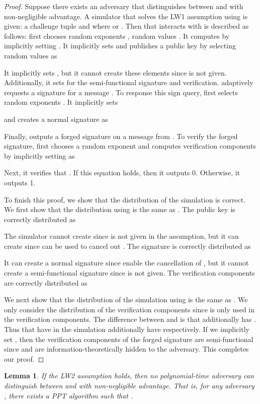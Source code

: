 \documentclass[11pt,letterpaper]{article}
\newcommand{\vs}{\vspace{1.5mm}}
\newtheorem{lemma}[theorem]{Lemma}
\begin{document}
\begin{proof}
Suppose there exists an adversary  that distinguishes between
 and  with non-negligible advantage. A simulator
 that solves the LW1 assumption using  is given: a
challenge tuple
     and 
    where  or .
Then  that interacts with  is described as follows:
 first chooses random exponents ,
random values . It computes  by implicitly
setting . It implicitly sets  and publishes a
public key  by selecting random values  as
    
It implicitly sets , but it cannot create these elements since  is
not given. Additionally, it sets  for the
semi-functional signature and verification.
 adaptively requests a signature for a message . To response this
sign query,  first selects random exponents . It implicitly sets
    
and creates a normal signature as
    
Finally,  outputs a forged signature  on a message  from . To verify the forged signature,
 first chooses a random exponent  and computes
verification components by implicitly setting  as
    
Next, it verifies that
    .
If this equation holds, then it outputs 0. Otherwise, it outputs 1.

\vs To finish this proof, we show that the distribution of the simulation is
correct. We first show that the distribution using 
is the same as . The public key is correctly distributed as
    
The simulator cannot create  since  is not given in the
assumption, but it can create  since
 can be used to cancel out . The signature is
correctly distributed as
    
It can create a normal signature since  enable the cancellation of
, but it cannot create a semi-functional signature since  is
not given. The verification components are correctly distributed as
    
We next show that the distribution of the simulation using  is the same as . We only consider the
distribution of the verification components since  is only used in the
verification components. The difference between  and  is that 
additionally has . Thus 
that have  in the simulation additionally have  respectively. If we implicitly set ,
then the verification components of the forged signature are semi-functional
since  and  are information-theoretically hidden to the adversary.
This completes our proof.
\end{proof}

\begin{lemma} \label{lem:pks2-prime-2}
If the LW2 assumption holds, then no polynomial-time adversary can
distinguish between  and  with non-negligible advantage.
That is, for any adversary , there exists a PPT algorithm 
such that
    .
\end{lemma}
\end{document}
